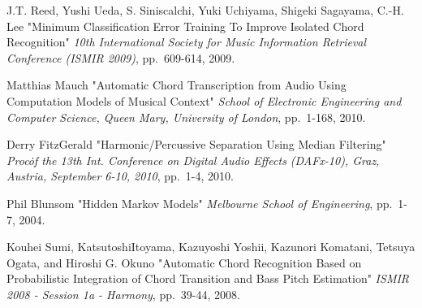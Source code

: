 \documentclass{article}
\begin{document}
\begin{thebibliography}{citations}
J.T. Reed, Yushi Ueda, S. Siniscalchi, Yuki Uchiyama, Shigeki Sagayama, C.-H. Lee
"Minimum Classification Error Training To Improve Isolated Chord Recognition"
{\it 10th International Society for Music Information Retrieval Conference (ISMIR 2009)},
pp.~609-614, 2009.

Matthias Mauch
"Automatic Chord Transcription from Audio Using Computation Models of Musical Context"
{\it School of Electronic Engineering and Computer Science, Queen Mary, University of London},
pp.~1-168, 2010.

Derry FitzGerald
"Harmonic/Percussive Separation Using Median Filtering"
{\it Proc\. of the 13th Int. Conference on Digital Audio Effects (DAFx-10), Graz, Austria, September 6-10, 2010},
pp.~1-4, 2010.

Phil Blunsom
"Hidden Markov Models"
{\it Melbourne School of Engineering},
pp.~1-7, 2004.

Kouhei Sumi, KatsutoshiItoyama, Kazuyoshi Yoshii, Kazunori Komatani, Tetsuya Ogata, and Hiroshi G. Okuno
"Automatic Chord Recognition Based on Probabilistic Integration of Chord Transition and Bass Pitch Estimation"
{\it ISMIR 2008 - Session 1a - Harmony},
pp.~39-44, 2008.

\end{thebibliography}

%
\end{document}
